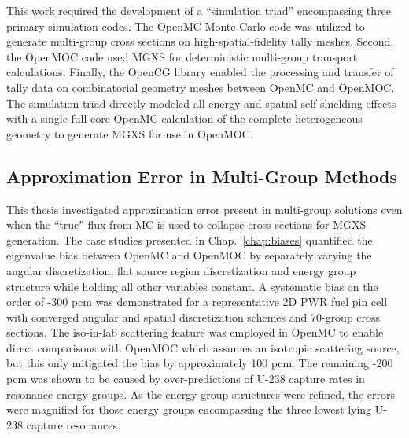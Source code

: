 This work required the development of a ``simulation triad'' encompassing three primary simulation codes. The OpenMC Monte Carlo code was utilized to generate multi-group cross sections on high-spatial-fidelity tally meshes. Second, the OpenMOC code used \ac{MGXS} for deterministic multi-group transport calculations. Finally, the OpenCG library enabled the processing and transfer of tally data on combinatorial geometry meshes between OpenMC and OpenMOC. The simulation triad directly modeled all energy and spatial self-shielding effects with a single full-core OpenMC calculation of the complete heterogeneous geometry to generate \ac{MGXS} for use in OpenMOC.

\subsection{Approximation Error in Multi-Group Methods}
\label{subsec:chap12-approx-error}

This thesis investigated approximation error present in multi-group solutions even when the ``true'' flux from \ac{MC} is used to collapse cross sections for \ac{MGXS} generation. The case studies presented in Chap.~\ref{chap:biases} quantified the eigenvalue bias between OpenMC and OpenMOC by separately varying the angular discretization, flat source region discretization and energy group structure while holding all other variables constant. A systematic bias on the order of -300 \ac{pcm} was demonstrated for a representative 2D \ac{PWR} fuel pin cell with converged angular and spatial discretization schemes and 70-group cross sections. The iso-in-lab scattering feature was employed in OpenMC to enable direct comparisons with OpenMOC which assumes an isotropic scattering source, but this only mitigated the bias by approximately 100 \ac{pcm}. The remaining -200 \ac{pcm} was shown to be caused by over-predictions of U-238 capture rates in resonance energy groups. As the energy group structures were refined, the errors were magnified for those energy groups encompassing the three lowest lying U-238 capture resonances.


